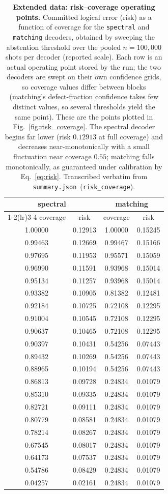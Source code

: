 \documentclass[reprint,aps,prxquantum,amsmath,amssymb,floatfix,nofootinbib,longbibliography]{revtex4-2}
\theoremstyle{definition}
\theoremstyle{remark}
\theoremstyle{plain}
\begin{document}
\begin{table}[tb]
    \centering
    \caption{\textbf{Extended data: risk--coverage operating points.} Committed logical error (risk) as a function of coverage for the \texttt{spectral} and \texttt{matching} decoders, obtained by sweeping the abstention threshold over the pooled $n=100{,}000$ shots per decoder (reported scale). Each row is an actual operating point stored by the run; the two decoders are swept on their own confidence grids, so coverage values differ between blocks (matching's defect-fraction confidence takes few distinct values, so several thresholds yield the same point). These are the points plotted in Fig.~\ref{fig:risk_coverage}. The spectral decoder begins far lower (risk $0.12913$ at full coverage) and decreases near-monotonically with a small fluctuation near coverage $0.55$; matching falls monotonically, as guaranteed under calibration by Eq.~\eqref{eq:risk}. Transcribed verbatim from \texttt{summary.json}~(\texttt{risk\_coverage}).}
    \label{tab:ed_rc}
\begin{tabular}{cccc}
\toprule
\multicolumn{2}{c}{spectral} & \multicolumn{2}{c}{matching} \\
\cmidrule(lr){1-2}\cmidrule(lr){3-4}
coverage & risk & coverage & risk \\
\midrule
1.00000 & 0.12913 & 1.00000 & 0.15245 \\
0.99463 & 0.12669 & 0.99467 & 0.15166 \\
0.97695 & 0.11953 & 0.95571 & 0.15059 \\
0.96990 & 0.11591 & 0.93968 & 0.15014 \\
0.95134 & 0.11257 & 0.93968 & 0.15014 \\
0.93382 & 0.10905 & 0.81382 & 0.12481 \\
0.92184 & 0.10725 & 0.72108 & 0.12295 \\
0.91004 & 0.10545 & 0.72108 & 0.12295 \\
0.90637 & 0.10465 & 0.72108 & 0.12295 \\
0.90397 & 0.10431 & 0.54256 & 0.07443 \\
0.89432 & 0.10269 & 0.54256 & 0.07443 \\
0.88965 & 0.10194 & 0.54256 & 0.07443 \\
0.86813 & 0.09728 & 0.24834 & 0.01079 \\
0.85310 & 0.09335 & 0.24834 & 0.01079 \\
0.82721 & 0.09111 & 0.24834 & 0.01079 \\
0.80779 & 0.08581 & 0.24834 & 0.01079 \\
0.78214 & 0.08267 & 0.24834 & 0.01079 \\
0.67545 & 0.08017 & 0.24834 & 0.01079 \\
0.64173 & 0.07537 & 0.24834 & 0.01079 \\
0.54786 & 0.08429 & 0.24834 & 0.01079 \\
0.04257 & 0.02161 & 0.24834 & 0.01079 \\
\bottomrule
\end{tabular}
\end{table}
\end{document}
